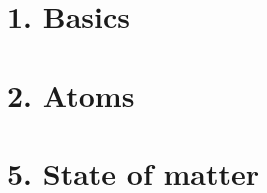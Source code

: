 \documentclass{cheatsheet}
\author{Noa Sendlhofer \& Christian Leser \\ nsendlhofer \& cleser}
\begin{document}
\section{1. Basics}
	
\section{2. Atoms}
	
\section{5. State of matter}
	
\end{document}
